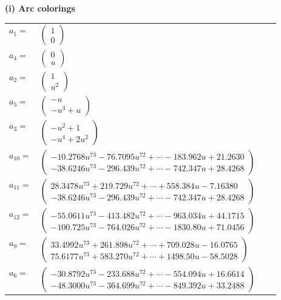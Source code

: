 \documentclass[1p]{elsarticle_modified}
\theoremstyle{definition}
\begin{document}
\flushleft \textbf{(i) Arc colorings}\\
\begin{tabular}{m{7pt} m{180pt} m{7pt} m{180pt} }
\flushright $a_{1}=$&$\begin{pmatrix}1\\0\end{pmatrix}$ \\
\flushright $a_{4}=$&$\begin{pmatrix}0\\u\end{pmatrix}$ \\
\flushright $a_{2}=$&$\begin{pmatrix}1\\u^2\end{pmatrix}$ \\
\flushright $a_{5}=$&$\begin{pmatrix}- u\\- u^3+u\end{pmatrix}$ \\
\flushright $a_{3}=$&$\begin{pmatrix}- u^2+1\\- u^4+2 u^2\end{pmatrix}$ \\
\flushright $a_{10}=$&$\begin{pmatrix}-10.2768 u^{73}-76.7095 u^{72}+\cdots-183.962 u+21.2630\\-38.6246 u^{73}-296.439 u^{72}+\cdots-742.347 u+28.4268\end{pmatrix}$ \\
\flushright $a_{11}=$&$\begin{pmatrix}28.3478 u^{73}+219.729 u^{72}+\cdots+558.384 u-7.16380\\-38.6246 u^{73}-296.439 u^{72}+\cdots-742.347 u+28.4268\end{pmatrix}$ \\
\flushright $a_{12}=$&$\begin{pmatrix}-55.0611 u^{73}-413.482 u^{72}+\cdots-963.034 u+44.1715\\-100.725 u^{73}-764.026 u^{72}+\cdots-1830.80 u+71.0456\end{pmatrix}$ \\
\flushright $a_{9}=$&$\begin{pmatrix}33.4992 u^{73}+261.898 u^{72}+\cdots+709.028 u-16.0765\\75.6177 u^{73}+583.270 u^{72}+\cdots+1498.50 u-58.5028\end{pmatrix}$ \\
\flushright $a_{6}=$&$\begin{pmatrix}-30.8792 u^{73}-233.688 u^{72}+\cdots-554.094 u+16.6614\\-48.3000 u^{73}-364.699 u^{72}+\cdots-849.392 u+33.2488\end{pmatrix}$ \\

\end{tabular}
\end{document}
